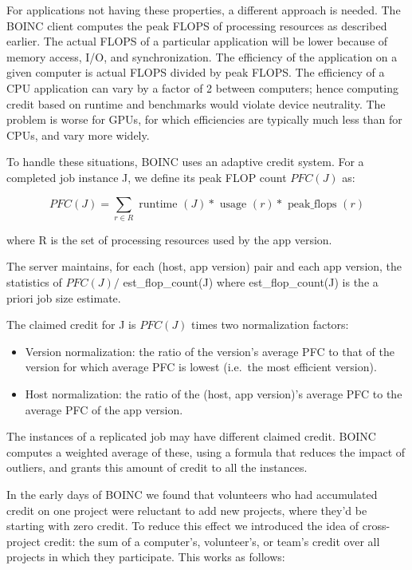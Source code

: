 \documentclass[
]{article}
\providecommand{\tightlist}{%
  \setlength{\itemsep}{0pt}\setlength{\parskip}{0pt}}
\begin{document}
For applications not having these properties, a different approach is
needed. The BOINC client computes the peak FLOPS of processing resources
as described earlier. The actual FLOPS of a particular application will
be lower because of memory access, I/O, and synchronization. The
efficiency of the application on a given computer is actual FLOPS
divided by peak FLOPS. The efficiency of a CPU application can vary by a
factor of 2 between computers; hence computing credit based on runtime
and benchmarks would violate device neutrality. The problem is worse for
GPUs, for which efficiencies are typically much less than for CPUs, and
vary more widely.

To handle these situations, BOINC uses an adaptive credit system. For a
completed job instance J, we define its peak FLOP count \(PFC(J)\) as:

\[
P F C (J) = \sum_ {r \in R} \text { runtime } (J) * \text { usage } (r) * \text { peak\_flops } (r)
\]

where R is the set of processing resources used by the app version.

The server maintains, for each (host, app version) pair and each app
version, the statistics of \(PFC(J)/\) est\_flop\_count(J) where
est\_flop\_count(J) is the a priori job size estimate.

The claimed credit for J is \(PFC(J)\) times two normalization factors:

\begin{itemize}
\tightlist
\item
  Version normalization: the ratio of the version's average PFC to that
  of the version for which average PFC is lowest (i.e.~the most
  efficient version).\\
\item
  Host normalization: the ratio of the (host, app version)'s average PFC
  to the average PFC of the app version.
\end{itemize}

The instances of a replicated job may have different claimed credit.
BOINC computes a weighted average of these, using a formula that reduces
the impact of outliers, and grants this amount of credit to all the
instances.

In the early days of BOINC we found that volunteers who had accumulated
credit on one project were reluctant to add new projects, where they'd
be starting with zero credit. To reduce this effect we introduced the
idea of cross-project credit: the sum of a computer's, volunteer's, or
team's credit over all projects in which they participate. This works as
follows:
\end{document}
